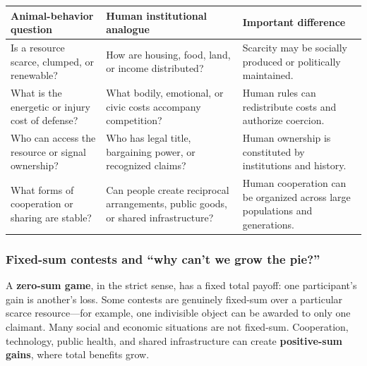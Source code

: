 \documentclass[
  11pt,
  letterpaper,
]{article}
\newcounter{none} %
\begin{document}
{\def\LTcaptype{none} %
\begin{longtable}[]{@{}
  >{\raggedright\arraybackslash}p{}
  >{\raggedright\arraybackslash}p{}
  >{\raggedright\arraybackslash}p{}@{}}
\toprule\noalign{}
\begin{minipage}[b]{\linewidth}\raggedright
Animal-behavior question
\end{minipage} & \begin{minipage}[b]{\linewidth}\raggedright
Human institutional analogue
\end{minipage} & \begin{minipage}[b]{\linewidth}\raggedright
Important difference
\end{minipage} \\
\midrule\noalign{}
\endhead
\bottomrule\noalign{}
\endlastfoot
Is a resource scarce, clumped, or renewable? & How are housing, food,
land, or income distributed? & Scarcity may be socially produced or
politically maintained. \\
What is the energetic or injury cost of defense? & What bodily,
emotional, or civic costs accompany competition? & Human rules can
redistribute costs and authorize coercion. \\
Who can access the resource or signal ownership? & Who has legal title,
bargaining power, or recognized claims? & Human ownership is constituted
by institutions and history. \\
What forms of cooperation or sharing are stable? & Can people create
reciprocal arrangements, public goods, or shared infrastructure? & Human
cooperation can be organized across large populations and
generations. \\
\end{longtable}
}

\subsubsection{Fixed-sum contests and ``why can't we grow the
pie?''}\label{fixed-sum-contests-and-why-cant-we-grow-the-pie}

A \textbf{zero-sum game}, in the strict sense, has a fixed total payoff:
one participant's gain is another's loss. Some contests are genuinely
fixed-sum over a particular scarce resource---for example, one
indivisible object can be awarded to only one claimant. Many social and
economic situations are not fixed-sum. Cooperation, technology, public
health, and shared infrastructure can create \textbf{positive-sum
gains}, where total benefits grow.
\end{document}
